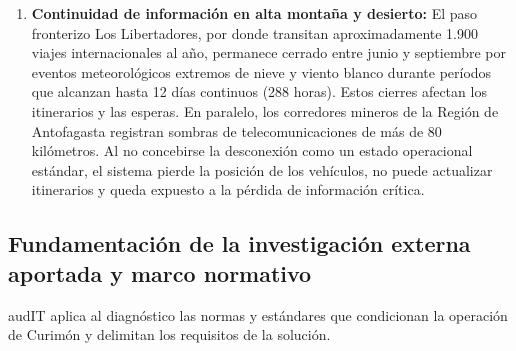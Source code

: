 \begin{enumerate}
  \item \textbf{Continuidad de información en alta montaña y desierto:} El paso fronterizo Los Libertadores, por donde transitan aproximadamente 1.900 viajes internacionales al año, permanece cerrado entre junio y septiembre por eventos meteorológicos extremos de nieve y viento blanco durante períodos que alcanzan hasta 12 días continuos (288 horas). Estos cierres afectan los itinerarios y las esperas. En paralelo, los corredores mineros de la Región de Antofagasta registran sombras de telecomunicaciones de más de 80 kilómetros. Al no concebirse la desconexión como un estado operacional estándar, el sistema pierde la posición de los vehículos, no puede actualizar itinerarios y queda expuesto a la pérdida de información crítica.
\end{enumerate}

\subsection{Fundamentación de la investigación externa aportada y marco normativo}\label{sec:2-marco-normativo}

audIT aplica al diagnóstico las normas y estándares que condicionan la operación de Curimón y delimitan los requisitos de la solución.

